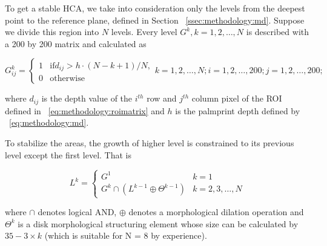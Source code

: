 To get a stable HCA, we take into consideration only the levels from the deepest point to the reference plane, defined in Section ~\ref{ssec:methodology:md}. Suppose we divide this region into $N$ levels. Every level $G^k, k=1,2,\dots,N$ is described with a 200 by 200 matrix and calculated as

\begin{equation}
G^k_{ij} =
    \begin{cases}
    1 & \text{if} d_{ij}>h\cdot(N-k+1)/N,\\
    0 & \text{otherwise}
    \end{cases}
k=1,2,\dots,N;i=1,2,\dots,200;j=1,2,\dots,200;
\end{equation}

where $d_{ij}$ is the depth value of the $i^{th}$ row and $j^{th}$ column pixel of the ROI defined in ~\ref{eq:methodology:roimatrix} and $h$ is the palmprint depth defined by ~\ref{eq:methodology:md}.

To stabilize the areas, the growth of higher level is constrained to its previous level except the first level. That is

\begin{equation}
L^k=
    \begin{cases}
    G^1                             & k=1 \\
    G^k \cap (L^{k-1} \oplus \Theta^{k-1}) & k=2,3,\dots,N
    \end{cases}
\end{equation}

where $\cap$ denotes logical AND, $\oplus$ denotes a morphological dilation operation and  $\Theta^{k}$ is a disk morphological structuring element whose size can be calculated by $35-3 \times k$ (which is suitable for N = 8 by experience).

